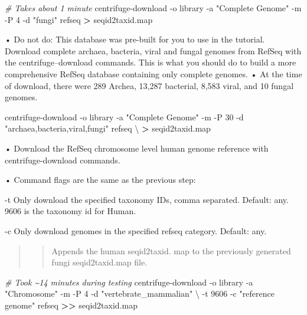 \documentclass[
]{book}
\newenvironment{Shaded}{\begin{snugshade}}{\end{snugshade}}
\newcommand{\AttributeTok}[1]{\textcolor[rgb]{0.77,0.63,0.00}{#1}}
\newcommand{\CommentTok}[1]{\textcolor[rgb]{0.56,0.35,0.01}{\textit{#1}}}
\newcommand{\DataTypeTok}[1]{\textcolor[rgb]{0.13,0.29,0.53}{#1}}
\newcommand{\ExtensionTok}[1]{#1}
\newcommand{\NormalTok}[1]{#1}
\newcommand{\OperatorTok}[1]{\textcolor[rgb]{0.81,0.36,0.00}{\textbf{#1}}}
\newcommand{\StringTok}[1]{\textcolor[rgb]{0.31,0.60,0.02}{#1}}
\begin{document}
\begin{Shaded}
\begin{Highlighting}[]
\CommentTok{\# Takes about 1 minute}
\ExtensionTok{centrifuge{-}download} \AttributeTok{{-}o}\NormalTok{ library }\AttributeTok{{-}a} \StringTok{"Complete Genome"} \AttributeTok{{-}m} \AttributeTok{{-}P}\NormalTok{ 4 }\AttributeTok{{-}d} \StringTok{"fungi"}\NormalTok{ refseq }\OperatorTok{\textgreater{}}\NormalTok{ seqid2taxid.map}
\end{Highlighting}
\end{Shaded}

• Do not do: This database was pre-built for you to use in the tutorial. Download complete archaea, bacteria, viral and fungal
genomes from RefSeq with the centrifuge--download commands. This is what you should do to build a more comprehensive
RefSeq database containing only complete genomes.
• At the time of download, there were 289 Archea, 13,287 bacterial, 8,583 viral, and 10 fungal genomes.

\begin{Shaded}
\begin{Highlighting}[]
\ExtensionTok{centrifuge{-}download} \AttributeTok{{-}o}\NormalTok{ library }\AttributeTok{{-}a} \StringTok{"Complete Genome"} \AttributeTok{{-}m} \AttributeTok{{-}P}\NormalTok{ 30 }\AttributeTok{{-}d} \StringTok{"archaea,bacteria,viral,fungi"}\NormalTok{ refseq }\DataTypeTok{\textbackslash{}}
\OperatorTok{\textgreater{}}\NormalTok{ seqid2taxid.map}
\end{Highlighting}
\end{Shaded}

• Download the RefSeq chromosome level human genome reference with centrifuge-download commands.

• Command flags are the same as the previous step:

-t Only download the specified taxonomy IDs, comma separated. Default: any. 9606 is the taxonomy id for Human.

-c Only download genomes in the specified refseq category. Default: any.

\begin{quote}
\begin{quote}
Appends the human seqid2taxid. map to the previously generated fungi seqid2taxid.map file.
\end{quote}
\end{quote}

\begin{Shaded}
\begin{Highlighting}[]
\CommentTok{\# Took \textasciitilde{}14 minutes during testing}
\ExtensionTok{centrifuge{-}download} \AttributeTok{{-}o}\NormalTok{ library }\AttributeTok{{-}a} \StringTok{"Chromosome"} \AttributeTok{{-}m} \AttributeTok{{-}P}\NormalTok{ 4 }\AttributeTok{{-}d} \StringTok{"vertebrate\_mammalian"} \DataTypeTok{\textbackslash{}}
\NormalTok{{-}t 9606 }\AttributeTok{{-}c} \StringTok{"reference genome"}\NormalTok{ refseq }\OperatorTok{\textgreater{}\textgreater{}}\NormalTok{ seqid2taxid.map}
\end{Highlighting}
\end{Shaded}
\end{document}
